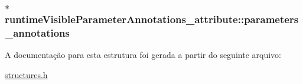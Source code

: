 \subsubsection[{\texorpdfstring{parameters\+\_\+annotations}{parameters_annotations}}]{$\ast$ runtime\+Visible\+Parameter\+Annotations\+\_\+attribute\+::parameters\+\_\+annotations}\hypertarget{structruntimeVisibleParameterAnnotations__attribute_a42e5e477f793842b0caeba7b32088740}{}\label{structruntimeVisibleParameterAnnotations__attribute_a42e5e477f793842b0caeba7b32088740}


A documentação para esta estrutura foi gerada a partir do seguinte arquivo\+:\begin{DoxyCompactItemize}
\item 
\hyperlink{structures_8h}{structures.\+h}\end{DoxyCompactItemize}
